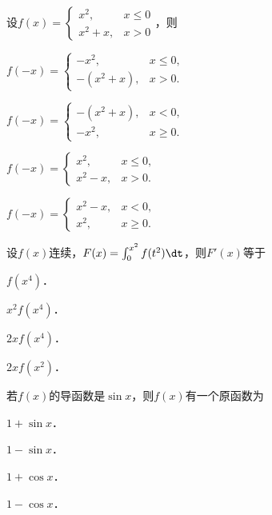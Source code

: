 \documentclass[plain,noanswer,medmath]{../../template/jnuexam}
\begin{document}
\begin{problem}
设$f(x) = \begin{cases}
      x^2, & x \le 0 \\
  x^2 + x, & x > 0
\end{cases}$，则\pickout{}
\begin{abcd}
\item $f(- x) = \begin{cases}
        -x^2, & x \le 0, \\
  -(x^2 + x), & x > 0.
\end{cases}$
\item $f(- x) = \begin{cases}
  -(x^2 + x), & x < 0, \\
        -x^2, & x \ge 0.
\end{cases}$
\item $f(- x) = \begin{cases}
      x^2, & x \le 0, \\
  x^2 - x, & x > 0.
\end{cases}$
\item $f(- x) = \begin{cases}
  x^2 - x, & x < 0, \\
      x^2, & x \ge 0.
\end{cases}$
\end{abcd}
\end{problem}




\begin{problem}
设$f(x)$连续，$F(x) = \int_0^{x^2} f(t^2)\dt$，则$F'(x)$等于\pickout{}
\begin{abcd}
\item $f(x^4)$．
\item $x^2 f(x^4)$．
\item $2xf(x^4)$．
\item $2xf(x^2)$．
\end{abcd}
\end{problem}


\begin{problem}
若$f(x)$的导函数是$\sin x$，则$f(x)$有一个原函数为\pickout{}
\begin{abcd}
\item $1 + \sin x$．    
\item $1 - \sin x$．    
\item $1 + \cos x$．    
\item $1 - \cos x$．
\end{abcd}
\end{problem}
\end{document}
